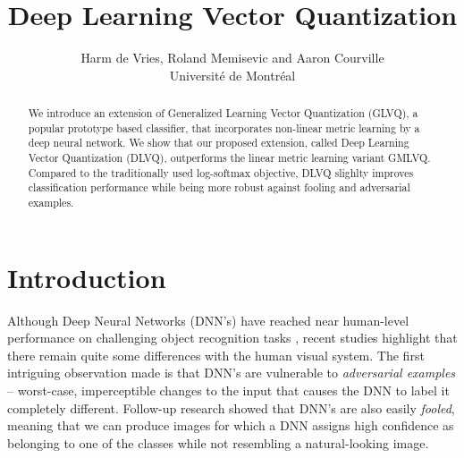 \documentclass{esannV2}
\begin{document}
\title{Deep Learning Vector Quantization}

\author{Harm de Vries, Roland Memisevic and Aaron Courville
%
%
\vspace{.3cm}\\
%
Universit\'{e} de Montr\'{e}al \\
%
}

\maketitle

\begin{abstract}
We introduce an extension of Generalized Learning Vector Quantization (GLVQ), a popular prototype based classifier, that incorporates non-linear metric learning by a deep neural network. We show that our proposed extension, called Deep Learning Vector Quantization (DLVQ), outperforms the linear metric learning variant GMLVQ. Compared to the traditionally used log-softmax objective, DLVQ slighlty improves classification performance while being more robust against fooling and adversarial examples. 
\end{abstract}

\section{Introduction}
Although Deep Neural Networks (DNN's) \cite{DBLP:journals/corr/abs-1206-5538} have reached near human-level performance on challenging object recognition tasks \cite{krizhevsky2012imagenet,DBLP:journals/corr/IoffeS15}, recent studies  highlight that there remain quite some differences with the human visual system. The first intriguing observation made is that DNN's are vulnerable to \emph{adversarial examples} \cite{DBLP:journals/corr/SzegedyZSBEGF13} -- worst-case, imperceptible changes to the input that causes the DNN to label it completely different. Follow-up research \cite{DBLP:journals/corr/NguyenYC14} showed that DNN's are also easily \emph{fooled}, meaning that we can produce images for which a DNN assigns high confidence as belonging to one of the classes while not resembling a natural-looking image.
\end{document}
